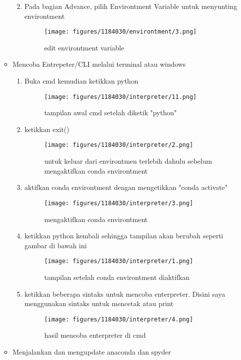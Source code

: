 \begin{enumerate}
\begin{itemize}
\begin{enumerate}
\begin{figure}[H]
				\end{figure}
			\item Pada bagian Advance, pilih Environtment Variable untuk menyunting environtment
				\begin{figure}[H]
				\texttt{[image: figures/1184030/environtment/3.png]}
				\centering
				\caption{edit environtment variable}
				\end{figure}
		\end{enumerate}
	\item Mencoba Entrepeter/CLI melalui terminal atau windows
		\begin{enumerate}
			\item Buka cmd kemudian ketikkan python
				\begin{figure}[H]
				\texttt{[image: figures/1184030/interpreter/11.png]}
				\centering
				\caption{tampilan awal cmd setelah diketik "python"}
				\end{figure}
			\item ketikkan exit()
				\begin{figure}[H]
				\texttt{[image: figures/1184030/interpreter/2.png]}
				\centering
				\caption{untuk keluar dari environtmen terlebih dahulu sebelum mengaktifkan conda environtment}
				\end{figure}
			\item aktifkan conda environtment dengan mengetikkan "conda activate"
				\begin{figure}[H]
				\texttt{[image: figures/1184030/interpreter/3.png]}
				\centering
				\caption{mengaktifkan conda environtment}
				\end{figure}
			\item ketikkan python kembali sehingga tampilan akan berubah seperti gambar di bawah ini
				\begin{figure}[H]
				\texttt{[image: figures/1184030/interpreter/1.png]}
				\centering
				\caption{tampilan setelah conda environtment diaktifkan}
				\end{figure}
			\item ketikkan beberapa sintaks untuk mencoba enterpreter. Disini saya menggunakan sintaks untuk mencetak atau print
				\begin{figure}[H]
				\texttt{[image: figures/1184030/interpreter/4.png]}
				\centering
				\caption{hasil mencoba enterpreter di cmd}
				\end{figure}
		\end{enumerate}
	\item Menjalankan dan mengupdate anaconda dan spyder

\end{itemize}
\end{enumerate}

